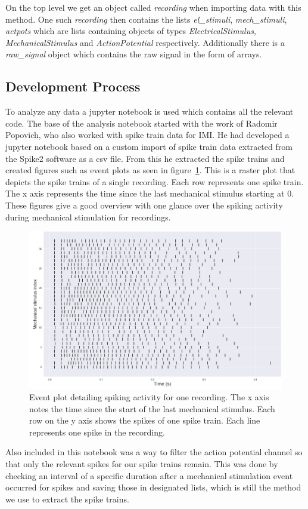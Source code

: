 On the top level we get an object called \textit{recording} when importing data with this method. One such \textit{recording} then contains the lists \textit{el\_stimuli}, \textit{mech\_stimuli}, \textit{actpots} which are lists containing objects of types \textit{ElectricalStimulus}, \textit{MechanicalStimulus} and \textit{ActionPotential} respectively. Additionally there is a \textit{raw\_signal} object which contains the raw signal in the form of arrays.


\subsection{Development Process}
To analyze any data a jupyter notebook is used which contains all the relevant code. The base of the analysis notebook started with the work of Radomir Popovich, who also worked with spike train data for IMI. He had developed a jupyter notebook based on a custom import of spike train data extracted from the Spike2 software as a csv file. From this he extracted the spike trains and created figures such as event plots as seen in figure~\ref{fig:eventplot}. This is a raster plot that depicts the spike trains of a single recording. Each row represents one spike train. The x axis represents the time since the last mechanical stimulus starting at 0. These figures give a good overview with one glance over the spiking activity during mechanical stimulation for recordings.
\begin{figure}
	\includegraphics[width = \textwidth]{src/pic/event_plot}
	\caption{Event plot detailing spiking activity for one recording. The x axis notes the time since the start of the last mechanical stimulus. Each row on the y axis shows the spikes of one spike train. Each line represents one spike in the recording.}
	\label{fig:eventplot}
\end{figure}
Also included in this notebook was a way to filter the action potential channel so that only the relevant spikes for our spike trains remain. This was done by checking an interval of a specific duration after a mechanical stimulation event occurred for spikes and saving those in designated lists, which is still the method we use to extract the spike trains.

